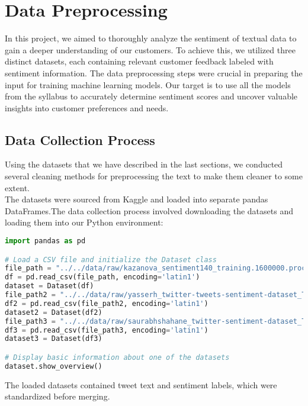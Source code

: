 \section{Data Preprocessing}

In this project, we aimed to thoroughly analyze the sentiment of textual data to gain a deeper understanding of our customers. To achieve this, we utilized three distinct datasets, each containing relevant customer feedback labeled with sentiment information. The data preprocessing steps were crucial in preparing the input for training machine learning models. Our target is to use all the models from the syllabus to accurately determine sentiment scores and uncover valuable insights into customer preferences and needs.

\subsection{Data Collection Process}

Using the datasets that we have described in the last sections, we conducted several cleaning methods for preprocessing the text to make them cleaner to some extent.\\

The datasets were sourced from Kaggle and loaded into separate pandas DataFrames.The data collection process involved downloading the datasets and loading them into our Python environment:

\begin{lstlisting}[language=Python, caption=Loading Datasets]
import pandas as pd

# Load a CSV file and initialize the Dataset class
file_path = "../../data/raw/kazanova_sentiment140_training.1600000.processed.noemoticon_with_headers.csv"
df = pd.read_csv(file_path, encoding='latin1')
dataset = Dataset(df)
file_path2 = "../../data/raw/yasserh_twitter-tweets-sentiment-dataset_Tweets_with_headers.csv"
df2 = pd.read_csv(file_path2, encoding='latin1')
dataset2 = Dataset(df2)
file_path3 = "../../data/raw/saurabhshahane_twitter-sentiment-dataset_Twitter_Data_with_headers.csv"
df3 = pd.read_csv(file_path3, encoding='latin1')
dataset3 = Dataset(df3)

# Display basic information about one of the datasets
dataset.show_overview()
\end{lstlisting}

The loaded datasets contained tweet text and sentiment labels, which were standardized before merging.

